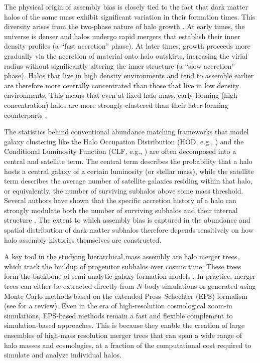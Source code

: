 The physical origin of assembly bias is closely tied to the fact that dark matter halos of the same mass exhibit significant variation in their formation times. This diversity arises from the two-phase nature of halo growth \citep{Zhao.etal.09, Hoffman.etal.07}. At early times, the universe is denser and halos undergo rapid mergers that establish their inner density profiles (a “fast accretion” phase). At later times, growth proceeds more gradually via the accretion of material onto halo outskirts, increasing the virial radius without significantly altering the inner structure (a “slow accretion” phase). Halos that live in high density environments and tend to assemble earlier are therefore more centrally concentrated than those that live in low density environments. This means that even at fixed halo mass, early-forming (high-concentration) halos are more strongly clustered than their later-forming counterparts \citep{Gao.etal.05, Wechsler.etal.06}.

The statistics behind conventional abundance matching frameworks that model galaxy clustering like the Halo Occupation Distribution (HOD, e.g., \cite{Berlind.etal.03, Zheng.etal.05}) and the Conditional Luminosity Function (CLF, e.g., \cite{Yang.etal.03, vdBosch.etal.13}) are often decomposed into a central and satellite term. The central term describes the probability that a halo hosts a central galaxy of a certain luminosity (or stellar mass), while the satellite term describes the average number of satellite galaxies residing within that halo, or equivalently, the number of surviving subhalos above some mass threshold. Several authors have shown that the specific accretion history of a halo can strongly modulate both the number of surviving subhalos and their internal structure \citep{vdBosch.etal.05a, Mao.etal.15, Jiang.vdBosch.17}. The extent to which assembly bias is captured in the abundance and spatial distribution of dark matter subhalos therefore depends sensitively on how halo assembly histories themselves are constructed.

A key tool in the studying hierarchical mass assembly are halo merger trees, which track the buildup of progenitor subhalos over cosmic time. These trees form the backbone of semi-analytic galaxy formation models \citep{White.Frenk.91, Somerville.Primack.99, Taylor.Babul.01, Zentner.etal.05}. In practice, merger trees can either be extracted directly from $N$-body simulations or generated using Monte Carlo methods based on the extended Press–Schechter (EPS) formalism (see \citealt{Zentner.07} for a review). Even in the era of high-resolution cosmological zoom-in simulations, EPS-based methods remain a fast and flexible complement to simulation-based approaches. This is because they enable the creation of large ensembles of high-mass resolution merger trees that can span a wide range of halo masses and cosmologies, at a fraction of the computational cost required to simulate and analyze individual halos.

